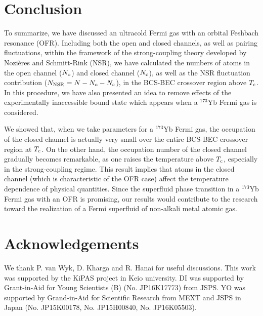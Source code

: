 \documentclass[a4paper]{jpconf}
\begin{document}
\section {Conclusion}
\par
To summarize, we have discussed an ultracold Fermi gas with an orbital Feshbach resonance (OFR). Including both the open and closed channels, as well as pairing fluctuations, within the framework of the strong-coupling theory developed by Nozi\`eres and Schmitt-Rink (NSR), we have calculated the numbers of atoms in the open channel ($N_{\rm o}$) and closed channel ($N_{\rm c}$), as well as the NSR fluctuation contribution ($N_{\rm NSR}=N-N_{\rm o}-N_{\rm c}$), in the BCS-BEC crossover region above $T_{\rm c}$. In this procedure, we have also presented an idea to remove effects of the experimentally inaccessible bound state which appears when a $^{173}$Yb Fermi gas is considered.
\par
We showed that, when we take parameters for a $^{173}$Yb Fermi gas, the occupation of the closed channel is actually very small over the entire BCS-BEC crossover region at $T_{\rm c}$. On the other hand, the occupation number of the closed channel gradually becomes remarkable, as one raises the temperature above $T_{\rm c}$, especially in the strong-coupling regime. This result implies that atoms in the closed channel (which is characteristic of the OFR case) affect the temperature dependence of physical quantities. Since the superfluid phase transition in a $^{173}$Yb Fermi gas with an OFR is promising, our results would contribute to the research toward the realization of a Fermi superfluid of non-alkali metal atomic gas.
\par
\section* {Acknowledgements}
We thank P. van Wyk, D. Kharga and R. Hanai for useful discussions. This work was supported by the KiPAS project in Keio university. DI was supported by Grant-in-Aid for Young Scientists (B) (No. JP16K17773) from JSPS. YO was supported by Grand-in-Aid for Scientific Research from MEXT and JSPS in Japan (No. JP15K00178, No. JP15H00840, No. JP16K05503).
\par
\par
\end{document}
